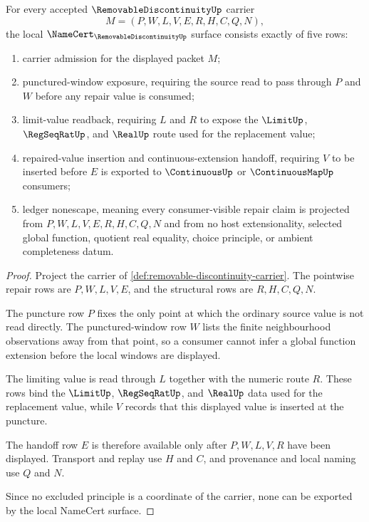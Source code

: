 \begin{theorem}
\label{thm:removable-discontinuity-namecert-obligations}
For every accepted $\RemovableDiscontinuityUp$ carrier
$$
M=(P,W,L,V,E,R,H,C,Q,N),
$$
the local $\NameCert_{\RemovableDiscontinuityUp}$ surface consists exactly of five rows:
\begin{enumerate}
\item carrier admission for the displayed packet $M$;
\item punctured-window exposure, requiring the source read to pass through $P$ and $W$ before any repair value is consumed;
\item limit-value readback, requiring $L$ and $R$ to expose the $\LimitUp$, $\RegSeqRatUp$, and $\RealUp$ route used for the replacement value;
\item repaired-value insertion and continuous-extension handoff, requiring $V$ to be inserted before $E$ is exported to $\ContinuousUp$ or $\ContinuousMapUp$ consumers;
\item ledger nonescape, meaning every consumer-visible repair claim is projected from $P,W,L,V,E,R,H,C,Q,N$ and from no host extensionality, selected global function, quotient real equality, choice principle, or ambient completeness datum.
\end{enumerate}
\end{theorem}
\begin{proof}
Project the carrier of \autoref{def:removable-discontinuity-carrier}. The pointwise repair rows are $P,W,L,V,E$, and the structural rows are $R,H,C,Q,N$.

The puncture row $P$ fixes the only point at which the ordinary source value is not read directly. The punctured-window row $W$ lists the finite neighbourhood observations away from that point, so a consumer cannot infer a global function extension before the local windows are displayed.

The limiting value is read through $L$ together with the numeric route $R$. These rows bind the $\LimitUp$, $\RegSeqRatUp$, and $\RealUp$ data used for the replacement value, while $V$ records that this displayed value is inserted at the puncture.

The handoff row $E$ is therefore available only after $P,W,L,V,R$ have been displayed. Transport and replay use $H$ and $C$, and provenance and local naming use $Q$ and $N$.

Since no excluded principle is a coordinate of the carrier, none can be exported by the local NameCert surface.
\end{proof}

